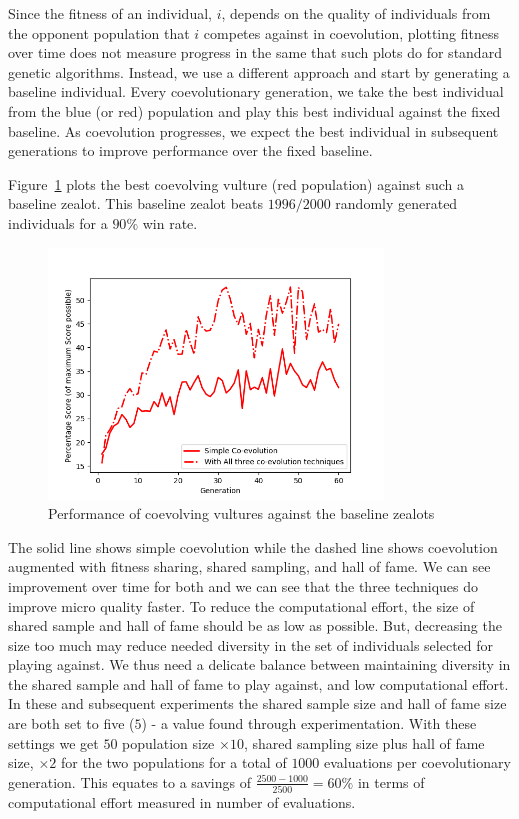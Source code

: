 \documentclass[conference,10pt]{IEEEtran}
\begin{document}
Since the fitness of an individual, $i$, depends on the quality of
individuals from the opponent population that $i$ competes against in
coevolution, plotting fitness over time does not measure progress in
the same that such plots do for standard genetic algorithms. Instead,
we use a different approach and start by generating a baseline
individual.  Every coevolutionary generation, we take the best
individual from the blue (or red) population and play this best
individual against the fixed baseline. As coevolution progresses, we
expect the best individual in subsequent generations to improve
performance over the fixed baseline.

Figure~\ref{CoVulturesVsZealots} plots the best coevolving vulture
(red population) against such a baseline zealot. This baseline zealot
beats $1996/2000$ randomly generated individuals for a $90\%$ win rate.
\begin{figure}
    \centerline{
      \includegraphics[width=3.5in]{Ronetype.png}
      }
    \caption{Performance of coevolving vultures against the baseline zealots}
    \label{CoVulturesVsZealots}
\end{figure}
The solid line shows simple coevolution while the dashed line shows
coevolution augmented with fitness sharing, shared sampling, and hall
of fame. We can see improvement over time for both and we can see that
the three techniques do improve micro quality faster.  To reduce the
computational effort, the size of shared sample and hall of fame
should be as low as possible. But, decreasing the size too much may
reduce needed diversity in the set of individuals selected for playing
against. We thus need a delicate balance between maintaining diversity
in the shared sample and hall of fame to play against, and low
computational effort. In these and subsequent experiments the shared
sample size and hall of fame size are both set to five ($5$) - a value
found through experimentation. With these settings we get $50$
population size $\times 10$, shared sampling size plus hall of fame
size, $\times 2$ for the two populations for a total of $1000$
evaluations per coevolutionary generation. This equates to a savings
of \( \frac{2500 - 1000}{2500} = 60\% \) in terms of computational
effort measured in number of evaluations.
\end{document}
